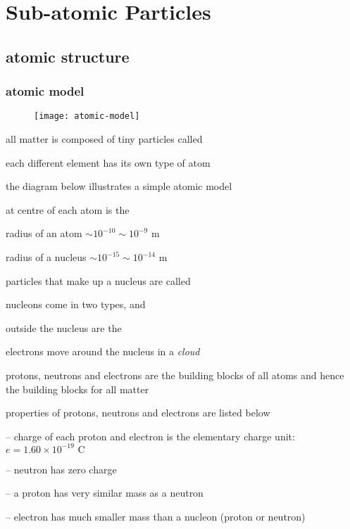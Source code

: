 \section{Sub-atomic Particles}

\subsection{atomic structure}

\subsubsection{atomic model}\label{ch:atomic-model}

\begin{wrapfigure}{r}{0.4\textwidth}
	\vspace*{5pt}
	\centering
	\texttt{[image: atomic-model]}
	\vspace*{-20pt}
\end{wrapfigure}

all matter is composed of tiny particles called 

each different element has its own type of atom

the diagram below illustrates a simple atomic model


\cmt at centre of each atom is the 

\cmt radius of an atom $\sim 10^{-10} \sim 10^{-9} \text{ m}$

radius of a nucleus $\sim 10^{-15} \sim 10^{-14} \text{ m}$

\cmt particles that make up a nucleus are called 

nucleons come in two types,  and 

\cmt outside the nucleus are the 

electrons move around the nucleus in a \emph{cloud}

\cmt protons, neutrons and electrons are the building blocks of all atoms and hence the building blocks for all matter

\cmt properties of protons, neutrons and electrons are listed below

\begin{compactenum}
	\item[--] charge of each proton and electron is the elementary charge unit: $e = 1.60 \times10^{-19} \text{ C}$
	
	\item[--] neutron has zero charge
	
	\item[--] a proton has very similar mass as a neutron
	
	\item[--] electron has much smaller mass than a nucleon (proton or neutron)
\end{compactenum}

